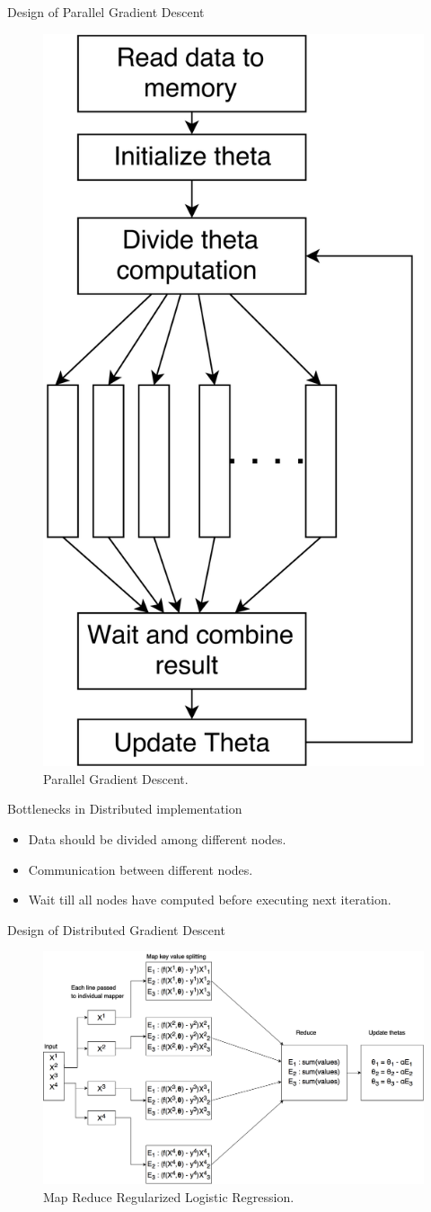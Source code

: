 \documentclass{beamer}
\begin{document}
\begin{frame}{Design of Parallel Gradient Descent}
	\begin{figure}[H]
		\centering
		\includegraphics[width=0.35\columnwidth]{images/slide_3.png}
		\caption{Parallel Gradient Descent.}
	\end{figure}	
\end{frame}

\begin{frame}{Bottlenecks in Distributed implementation}
	\begin{itemize}
		\item Data should be divided among different nodes.
		\item Communication between different nodes.
		\item Wait till all nodes have computed before executing next iteration.
	\end{itemize}
\end{frame}

\begin{frame}{Design of Distributed Gradient Descent}
	\begin{figure}[H]
		\centering
		\includegraphics[width=1\columnwidth]{images/slide_5.png}
		\caption{Map Reduce Regularized Logistic Regression.}
	\end{figure}
	
\end{frame}
\end{document}
